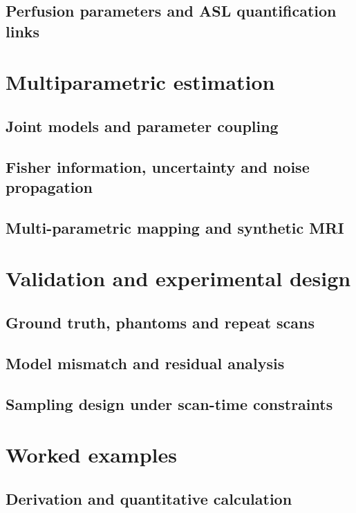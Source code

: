 \subsection{Perfusion parameters and ASL quantification links}

\section{Multiparametric estimation}
\label{sec:11:multiparametric-estimation}
\subsection{Joint models and parameter coupling}
\subsection{Fisher information, uncertainty and noise propagation}
\subsection{Multi-parametric mapping and synthetic MRI}

\section{Validation and experimental design}
\label{sec:11:validation-and-experimental-design}
\subsection{Ground truth, phantoms and repeat scans}
\subsection{Model mismatch and residual analysis}
\subsection{Sampling design under scan-time constraints}

\section{Worked examples}
\label{sec:11:worked-examples}
\subsection{Derivation and quantitative calculation}
